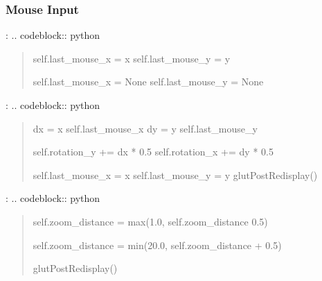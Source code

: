 \documentclass[a4paper,10pt,english,openany,oneside]{sphinxmanual}
\begin{document}
\subsubsection{Mouse Input}
\label{\detokenize{api/ui:mouse-input}}
\sphinxAtStartPar
{}:
.. code\sphinxhyphen{}block:: python
\begin{quote}
\begin{description}
\begin{description}
\begin{description}
\sphinxAtStartPar
self.last\_mouse\_x = x
self.last\_mouse\_y = y

\sphinxAtStartPar
self.last\_mouse\_x = None
self.last\_mouse\_y = None

\end{description}

\end{description}

\end{description}
\end{quote}

\sphinxAtStartPar
{}:
.. code\sphinxhyphen{}block:: python
\begin{quote}
\begin{description}
\begin{description}
\sphinxAtStartPar
dx = x \sphinxhyphen{} self.last\_mouse\_x
dy = y \sphinxhyphen{} self.last\_mouse\_y

\sphinxAtStartPar
self.rotation\_y += dx * 0.5
self.rotation\_x += dy * 0.5

\sphinxAtStartPar
self.last\_mouse\_x = x
self.last\_mouse\_y = y
glutPostRedisplay()

\end{description}

\end{description}
\end{quote}

\sphinxAtStartPar
{}:
.. code\sphinxhyphen{}block:: python
\begin{quote}
\begin{description}
\begin{description}
\sphinxAtStartPar
self.zoom\_distance = max(1.0, self.zoom\_distance \sphinxhyphen{} 0.5)

\sphinxAtStartPar
self.zoom\_distance = min(20.0, self.zoom\_distance + 0.5)

\end{description}

\sphinxAtStartPar
glutPostRedisplay()

\end{description}
\end{quote}
\end{document}
